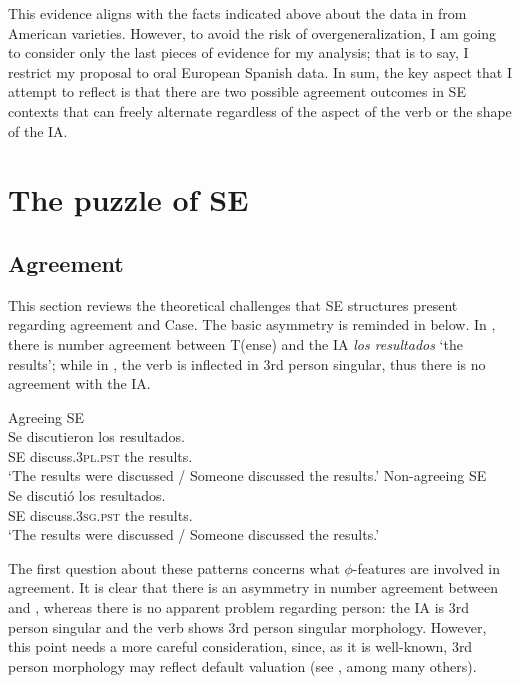 \documentclass[output=paper,colorlinks,citecolor=brown]{langscibook}
\begin{document}
This evidence aligns with the facts indicated above about the data in  from American varieties. However, to avoid the risk of overgeneralization, I am going to consider only the last pieces of evidence for my analysis; that is to say, I restrict my proposal to oral European Spanish data. In sum, the key aspect that I attempt to reflect is that there are two possible agreement outcomes in SE contexts that can freely alternate regardless of the aspect of the verb or the shape of the IA.


\section{The puzzle of SE} \label{05:theory}

\subsection{Agreement}\label{05:sec:fernandez:3.1}
This section reviews the theoretical challenges that SE structures present regarding agreement and Case. The basic asymmetry is reminded in  below. In , there is number agreement between T(ense) and the IA \textit{los resultados} `the results'; while in , the verb is inflected in 3rd person singular, thus there is no agreement with the IA.

\ea \label{ex:05:basicasymcopy}
\ea \label{ex:05:SEbasicacopy}
        Agreeing SE \\
        \gll Se discutieron los resultados.  \\
            SE discuss.\textsc{3pl.pst} the results. \\
        \glt `The results were discussed / Someone discussed the results.'
\ex \label{ex:05:SEbasicvcopy}
        Non-agreeing SE \\
        \gll Se discutió los resultados.  \\
            SE discuss.\textsc{3sg.pst} the results. \\
        \glt `The results were discussed / Someone discussed the results.'
\z \z

The first question about these patterns concerns what $\phi$-features are involved in agreement. It is clear that there is an asymmetry in number agreement between  and , whereas there is no apparent problem regarding person: the IA is 3rd person singular and the verb shows 3rd person singular morphology. However, this point needs a more careful consideration, since, as it is well-known, 3rd person morphology may reflect default valuation (see \cite{Preminger2014}, among many others).
\end{document}
